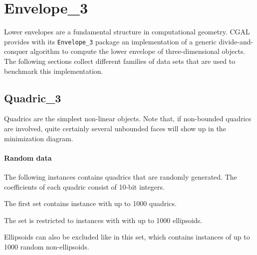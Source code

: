 \section{Envelope\_3\label{bi_sec:Envelope3}}

Lower envelopes are a fundamental structure in computational geometry.
CGAL provides with its {\tt Envelope\_3} package an implementation
of a generic divide-and-conquer algorithm to compute the lower envelope
of three-dimensional objects. 
The following sections collect different families of data sets that are used
to benchmark this implementation.

\subsection{Quadric\_3\label{bi_ssec:Envelope3Quadric3}}

Quadrics are the simplest non-linear objects. 
Note that, if non-bounded quadrics
are involved, quite certainly several unbounded faces will show up in the
minimization diagram.

\paragraph{Random data\label{bi_subsec:Envelope3Quadric3Randomdata}}

The following instances contains quadrics that are randomly generated. 
The coefficients of each quadric consist of 10-bit integers.

The first set contains instance with up to 1000 quadrics.

The set is restricted to instances with with up to 1000 ellipsoids.

Ellipsoids can also be excluded like in this set, which 
contains instances of up to 1000 random non-ellipsoids.


